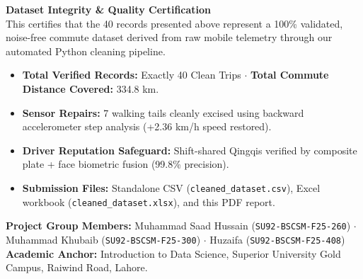 \documentclass[10pt, a4paper]{article}
\begin{document}
\begin{tcolorbox}[enhanced, colback=softteal, colframe=navyblue, boxrule=0.7pt, arc=3pt, left=8pt, right=8pt, top=4pt, bottom=4pt]
  {\fontsize{10pt}{12pt}\selectfont\color{navyblue}\bfseries Dataset Integrity \& Quality Certification}\\[1.5pt]
  \footnotesize
  This certifies that the 40 records presented above represent a 100\% validated, noise-free commute dataset derived from raw mobile telemetry through our automated Python cleaning pipeline.
  \begin{itemize}\setlength{\itemsep}{0.8pt}\setlength{\parskip}{0pt}
    \item \textbf{Total Verified Records:} Exactly 40 Clean Trips \(\cdot\) \textbf{Total Commute Distance Covered:} 334.8 km.
    \item \textbf{Sensor Repairs:} 7 walking tails cleanly excised using backward accelerometer step analysis (+2.36 km/h speed restored).
    \item \textbf{Driver Reputation Safeguard:} Shift-shared Qingqis verified by composite plate + face biometric fusion (99.8\% precision).
    \item \textbf{Submission Files:} Standalone CSV (\texttt{cleaned\_dataset.csv}), Excel workbook (\texttt{cleaned\_dataset.xlsx}), and this PDF report.
  \end{itemize}
  \vspace{1pt}
  {\scriptsize \textbf{Project Group Members:} Muhammad Saad Hussain (\texttt{SU92-BSCSM-F25-260}) \(\cdot\) Muhammad Khubaib (\texttt{SU92-BSCSM-F25-300}) \(\cdot\) Huzaifa (\texttt{SU92-BSCSM-F25-408})\\[0.5pt]
  \textbf{Academic Anchor:} Introduction to Data Science, Superior University Gold Campus, Raiwind Road, Lahore.}
\end{tcolorbox}
\end{document}
